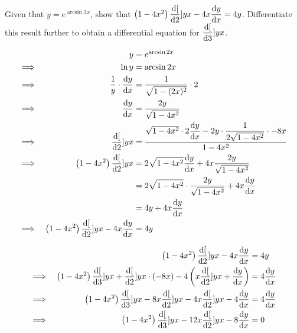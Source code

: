 \documentclass{echw}
\begin{document}
    \problem{}
        Given that $y = e^{\arcsin{2x}}$, show that $\left(1-4x^2\right)\dfrac{\mathrm{d} [}{\mathrm{d} 2}]{y}{x} - 4x\dfrac{\mathrm{d} y}{\mathrm{d} x} = 4y$. Differentiate this result further to obtain a differential equation for $\dfrac{\mathrm{d} [}{\mathrm{d} 3}]{y}{x}$.

    \solution
        \begin{alignat*}{2}
            &&y &= e^{\arcsin{2x}}\\
            \implies&& \ln y &= \arcsin{2x}\\
            \implies&& \dfrac1y \cdot \dfrac{\mathrm{d} y}{\mathrm{d} x} &= \dfrac{1}{\sqrt{1 - (2x)^2}} \cdot 2\\
            \implies&& \dfrac{\mathrm{d} y}{\mathrm{d} x} &= \dfrac{2y}{\sqrt{1 - 4x^2}}\\
            \implies&& \dfrac{\mathrm{d} [}{\mathrm{d} 2}]{y}{x} &= \dfrac{\sqrt{1 - 4x^2} \cdot 2\dfrac{\mathrm{d} y}{\mathrm{d} x} - 2y \cdot \dfrac{1}{2\sqrt{1-4x^2}} \cdot -8x}{1-4x^2}\\
            \implies&& \left(1-4x^2\right)\dfrac{\mathrm{d} [}{\mathrm{d} 2}]{y}{x} &= 2\sqrt{1 - 4x^2} \dfrac{\mathrm{d} y}{\mathrm{d} x} + 4x \dfrac{2y}{\sqrt{1-4x^2}}\\
            && &= 2\sqrt{1 - 4x^2} \cdot \dfrac{2y}{\sqrt{1 - 4x^2}} + 4x \dfrac{\mathrm{d} y}{\mathrm{d} x} \\
            && &= 4y + 4x \dfrac{\mathrm{d} y}{\mathrm{d} x} \\
            \implies&& \left(1-4x^2\right)\dfrac{\mathrm{d} [}{\mathrm{d} 2}]{y}{x} -4x \dfrac{\mathrm{d} y}{\mathrm{d} x} &= 4y \\
        \end{alignat*}

        \begin{alignat*}{2}
            && \left(1-4x^2\right)\dfrac{\mathrm{d} [}{\mathrm{d} 2}]{y}{x} -4x \dfrac{\mathrm{d} y}{\mathrm{d} x} &= 4y\\
            \implies&&\left(1 - 4x^2\right) \dfrac{\mathrm{d} [}{\mathrm{d} 3}]{y}{x} + \dfrac{\mathrm{d} [}{\mathrm{d} 2}]{y}{x} \cdot (-8x) - 4\left(x  \dfrac{\mathrm{d} [}{\mathrm{d} 2}]{y}{x} + \dfrac{\mathrm{d} y}{\mathrm{d} x} \right) &= 4\dfrac{\mathrm{d} y}{\mathrm{d} x}\\
            \implies&&\left(1 - 4x^2\right) \dfrac{\mathrm{d} [}{\mathrm{d} 3}]{y}{x} -8x \dfrac{\mathrm{d} [}{\mathrm{d} 2}]{y}{x} - 4x  \dfrac{\mathrm{d} [}{\mathrm{d} 2}]{y}{x} - 4\dfrac{\mathrm{d} y}{\mathrm{d} x} &= 4\dfrac{\mathrm{d} y}{\mathrm{d} x}\\
            \implies&&\left(1 - 4x^2\right) \dfrac{\mathrm{d} [}{\mathrm{d} 3}]{y}{x} -12x \dfrac{\mathrm{d} [}{\mathrm{d} 2}]{y}{x} - 8\dfrac{\mathrm{d} y}{\mathrm{d} x} &= 0
        \end{alignat*}

\end{document}
